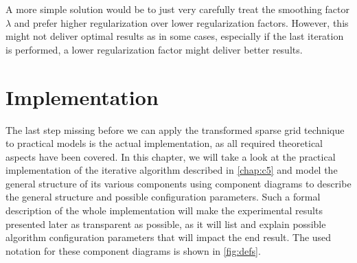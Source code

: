 \documentclass[
  a4paper,  %
  twoside,  %
  bibliography=totoc,
  headsepline,
  cleardoublepage=empty,
  parskip=half,
  draft=false
]{scrbook}
\begin{document}
A more simple solution would be to just very carefully treat the smoothing factor $\lambda$ and prefer higher regularization over lower regularization factors.
However, this might not deliver optimal results as in some cases, especially if the last iteration is performed, a lower regularization factor might deliver better results.

\chapter{Implementation}
\label{chap:c6}

The last step missing before we can apply the transformed sparse grid technique to practical models is the actual implementation, as all required theoretical aspects have been covered.
In this chapter, we will take a look at the practical implementation of the iterative algorithm described in \cref{chap:c5} and model the general structure of its various components using component diagrams to describe the general structure and possible configuration parameters.
Such a formal description of the whole implementation will make the experimental results presented later as transparent as possible, as it will list and explain possible algorithm configuration parameters that will impact the end result.
The used notation for these component diagrams is shown in \cref{fig:defs}.
\end{document}
